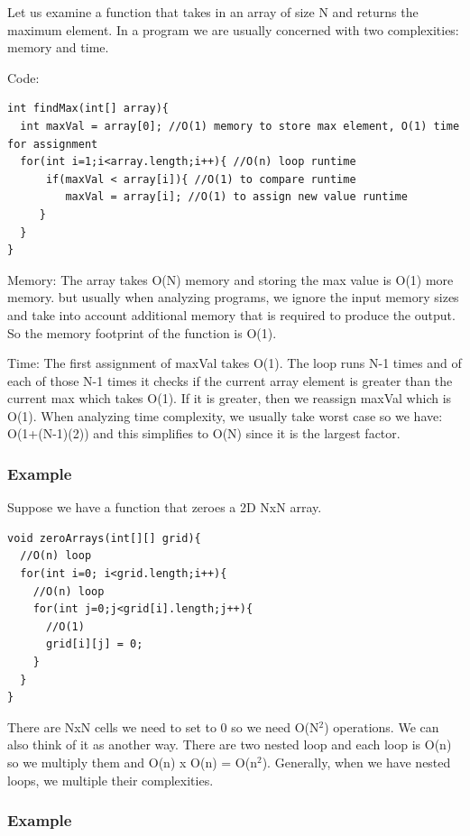 \documentclass[11pt,oneside]{book}
\begin{document}
Let us examine a function that takes in an array of size N and returns the maximum element. In a program we are usually concerned with two complexities: memory and time.

Code:

\begin{lstlisting}
int findMax(int[] array){
  int maxVal = array[0]; //O(1) memory to store max element, O(1) time for assignment
  for(int i=1;i<array.length;i++){ //O(n) loop runtime
      if(maxVal < array[i]){ //O(1) to compare runtime
         maxVal = array[i]; //O(1) to assign new value runtime
     }
  }
}
\end{lstlisting}

Memory: The array takes O(N) memory and storing the max value is O(1) more memory. but usually when analyzing programs, we ignore the input memory sizes and take into account additional memory that is required to produce the output. So the memory footprint of the function is O(1).

Time: The first assignment of maxVal takes O(1). The loop runs N-1 times and of each of those N-1 times it checks if the current array element is greater than the current max which takes O(1). If it is greater, then we reassign maxVal which is O(1). When analyzing time complexity, we usually take worst case so we have: O(1+(N-1)(2)) and this simplifies to O(N) since it is the largest factor.

\subsubsection{Example}

Suppose we have a function that zeroes a 2D NxN array.

\begin{lstlisting}
void zeroArrays(int[][] grid){
  //O(n) loop
  for(int i=0; i<grid.length;i++){
    //O(n) loop
    for(int j=0;j<grid[i].length;j++){
      //O(1)
      grid[i][j] = 0;
    }
  }
}
\end{lstlisting}

There are NxN cells we need to set to 0 so we need O(N$^{2}$) operations. We can also think of it as another way. There are two nested loop and each loop is O(n) so we multiply them and O(n) x O(n) = O(n$^{2}$). Generally, when we have nested loops, we multiple their complexities.

\subsubsection{Example}
\end{document}

